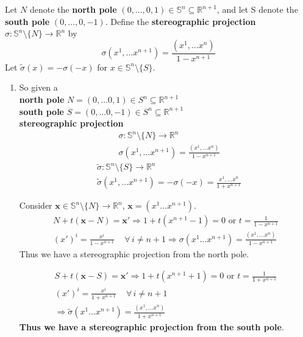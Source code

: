
Let $N$ denote the \textbf{north pole} $(0, \dots, 0, 1) \in \mathbb{S}^n \subseteq \mathbb{R}^{n+1}$, and let S denote the \textbf{south pole} $(0, \dots , 0 , -1)$. Define the \textbf{stereographic projection} $\sigma: \mathbb{S}^n \setminus \lbrace N \rbrace \to \mathbb{R}^n$ by 
\[
\sigma(x^1, \dots x^{n+1}) = \frac{ (x^1, \dots x^n ) }{ 1 - x^{n+1}}
\]
Let $\widetilde{\sigma}(x) = -\sigma(-x)$ for $x\in \mathbb{S}^n \setminus \lbrace S \rbrace$.

\begin{enumerate}
	\item[(a)] So given a \\
	\textbf{north pole} $N = (0, \dots 0, 1) \in S^n \subseteq \mathbb{R}^{n+1}$ \\
	\textbf{south pole} $S = (0, \dots 0,-1) \in S^n \subseteq \mathbb{R}^{n+1}$ \\
	\textbf{stereographic projection} 
	\[
	\begin{aligned}
		& \sigma : \mathbb{S}^n \setminus \lbrace N \rbrace \to \mathbb{R}^n \\
		& \sigma(x^1 , \dots x^{n+1}) = \frac{ (x^1, \dots x^n ) }{ 1 - x^{n+1}} 
	\end{aligned}
	\]
	\[
	\begin{aligned}
		& \widetilde{\sigma}: \mathbb{S}^n \setminus \lbrace S \rbrace \to \mathbb{R}^n \\
		& \widetilde{\sigma}(x^1 , \dots x^{n+1}) = -\sigma(-x) = \frac{ x^1, \dots x^n }{ 1 + x^{n+1}}
	\end{aligned}
	\]

Consider $\mathbf{x} \in \mathbb{S}^n \setminus \lbrace N \rbrace \to \mathbb{R}^n$, $\mathbf{x} = (x^1 \dots x^{n+1})$.
\[
\begin{gathered}
	N + t(\mathbf{x} - N) = \mathbf{x}' \Longrightarrow 1 + t(x^{n+1} - 1 ) = 0 \text{ or } t = \frac{1}{ 1- x^{n+1}} \\
	(x')^i = \frac{x^i}{ 1 - x^{n+1}}  \quad \, \forall \, i \neq n + 1
\Longrightarrow \sigma(x^1 \dots x^{n+1}) = \frac{ (x^1, \dots x^n) }{ 1 - x^{n+1}}
\end{gathered}
\]
Thus we have a stereographic projection from the north pole.

\[
\begin{gathered}
	S + t(\mathbf{x} - S) = \mathbf{x}' \Longrightarrow 1 + t(x^{n+1} + 1) = 0 \text{ or } t= \frac{1}{1 + x^{n+1}} \\
	(x')^i = \frac{x^i }{ 1 + x^{n+1}} \quad \, \forall \, i \neq n + 1 \\
	\Longrightarrow \widetilde{\sigma}(x^1 \dots x^{n+1}) = \frac{ (x^1, \dots x^n) }{ 1 + x^{n+1}}
\end{gathered}
\]
\textbf{Thus we have a stereographic projection from the south pole}.


\end{enumerate}
